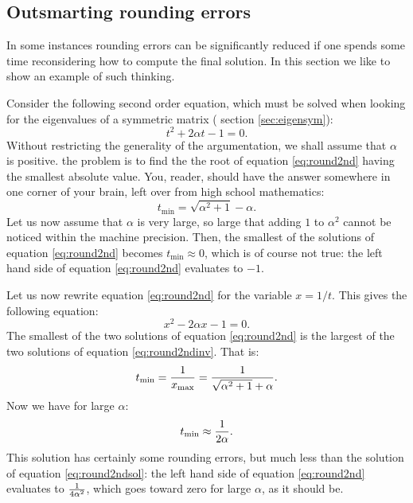 \subsection{Outsmarting rounding errors}
\label{sec:outsmart} In some instances rounding errors can be
significantly reduced if one spends some time reconsidering how to
compute the final solution. In this section we like to show an
example of such thinking.

Consider the following second order equation, which must be solved
when looking for the eigenvalues of a symmetric matrix (\cf
section \ref{sec:eigensym}):
\begin{equation}
\label{eq:round2nd}
  t^2+2\alpha t - 1 =0.
\end{equation}
Without restricting the generality of the argumentation, we shall
assume that $\alpha$ is positive. the problem is to find the the
root of equation \ref{eq:round2nd} having the smallest absolute
value. You, reader, should have the answer somewhere in one corner
of your brain, left over from high school mathematics:
\begin{equation}
\label{eq:round2ndsol}
  t_{\min}=\sqrt{\alpha^2+1} - \alpha.
\end{equation}
Let us now assume that $\alpha$ is very large, so large that
adding $1$ to $\alpha^2$ cannot be noticed within the machine
precision. Then, the smallest of the solutions of equation
\ref{eq:round2nd} becomes $t_{\min}\approx 0$, which is of course
not true: the left hand side of equation  \ref{eq:round2nd}
evaluates to $-1$.

\noindent Let us now rewrite equation \ref{eq:round2nd} for the
variable $x=1/t$. This gives the following equation:
\begin{equation}
\label{eq:round2ndinv}
  x^2-2\alpha x - 1 =0.
\end{equation}
The smallest of the two solutions of equation \ref{eq:round2nd} is
the largest of the two solutions of equation \ref{eq:round2ndinv}.
That is:
\begin{equation}
  t_{\min}={1\over x_{\max}}={1 \over \sqrt{\alpha^2+1} + \alpha}.
\end{equation}
Now we have for large $\alpha$:
\begin{equation}
  t_{\min}\approx {1\over 2\alpha}.
\end{equation}
This solution has certainly some rounding errors, but much less
than the solution of equation \ref{eq:round2ndsol}: the left hand
side of equation \ref{eq:round2nd} evaluates to ${1\over
4\alpha^2}$, which goes toward zero for large $\alpha$, as it
should be.

